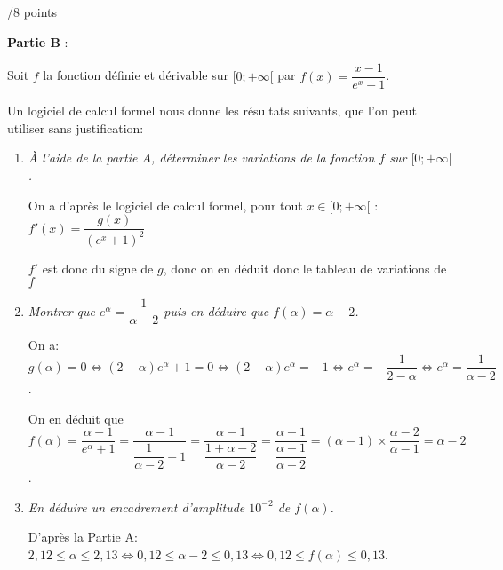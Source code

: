 \documentclass[a4paper]{article}
\begin{document}
\begin{exerciceinterro}{\hspace{2cm}/8 points}{}
\begin{enumerate}
\begin{enumerate}
	\end{enumerate}
\end{enumerate}

\medskip
\textbf{Partie B} :

Soit $f$ la fonction définie et dérivable sur $[0;+\infty[$ par $f(x)=\dfrac{x-1}{e^x+1}$.

Un logiciel de calcul formel nous donne les résultats suivants, que l'on peut utiliser sans justification:
          
\begin{CalculFormelXcas}[TexteOptions=XCas Calcul Formel, Sep=false]
\end{CalculFormelXcas}


\begin{enumerate}
	\item \textit{\`A l'aide de la partie $A$, déterminer les variations de la fonction $f$ sur $[0;+\infty[$.}

	On a d'après le logiciel de calcul formel, pour tout $x\in[0;+\infty[$ : $f'(x)=\dfrac{g(x)}{(e^x+1)^2}$

	$f'$ est donc du signe de $g$, donc on en déduit donc le tableau de variations de $f$ 


	\begin{center}
		\end{center}



	\item \textit{Montrer que $e^\alpha=\dfrac{1}{\alpha-2}$ puis en déduire que $f(\alpha)=\alpha-2$.}
	
	On a:  $g(\alpha)=0 \iff (2-\alpha)e^\alpha+1=0 \iff (2-\alpha)e^\alpha=-1 \iff e^\alpha = -\dfrac{1}{2-\alpha} \iff e^\alpha=\dfrac{1}{\alpha-2}$.

	On en déduit que $f(\alpha)=\dfrac{\alpha- 1}{e^\alpha+1}=\dfrac{\alpha-1}{\dfrac{1}{\alpha-2}+1}=\dfrac{\alpha-1}{\dfrac{1+\alpha-2}{\alpha-2}}=\dfrac{\alpha-1}{\dfrac{\alpha-1}{\alpha-2}}=(\alpha-1)\times \dfrac{\alpha-2}{\alpha-1}=\alpha-2$.
	\item \textit{En déduire un encadrement d'amplitude $10^{-2}$ de $f(\alpha)$.}
	
	D'après la Partie A: $2,12 \leqslant \alpha \leqslant 2,13 \iff 0,12 \leqslant \alpha-2 \leqslant 0,13 \iff0,12 \leqslant f(\alpha)\leqslant 0,13$.

\end{enumerate}

\medskip

\end{exerciceinterro}
\end{document}
